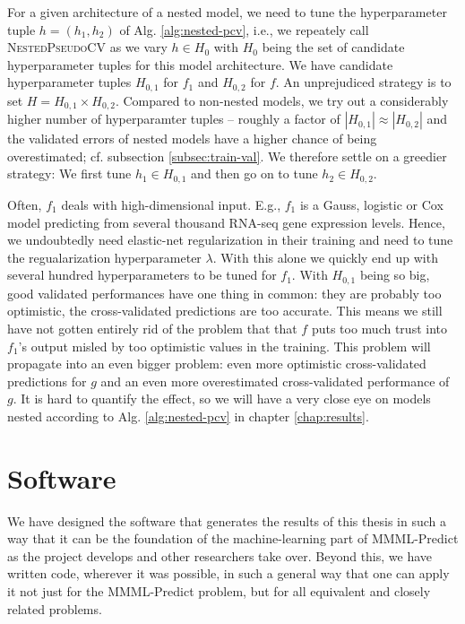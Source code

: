 For a given architecture of a nested model, we need to tune the hyperparameter tuple $h = (h_1, h_2)$ 
of 
Alg. \ref{alg:nested-pcv}, i.e., we repeately call \textsc{NestedPseudoCV} as we vary $h \in H_0$
with $H_0$ being the set of candidate hyperparameter tuples for this model architecture. We have 
candidate 
hyperparameter tuples $H_{0, 1}$ for $f_1$ and $H_{0, 2}$ for $f$. An unprejudiced strategy is to 
set $H = H_{0, 1} \times H_{0, 2}$. Compared to non-nested models, we try out a considerably 
higher number of hyperparamter tuples -- roughly a factor of $|H_{0, 1}| \approx |H_{0, 2}|$ and 
the validated errors of nested models have a higher chance 
of being overestimated; cf. subsection \ref{subsec:train-val}. We therefore settle on a greedier 
strategy: We first tune $h_1 \in H_{0, 1}$ and then go on to tune $h_2 \in H_{0, 2}$. 

Often, $f_1$ deals with high-dimensional input. E.g., $f_1$ is a Gauss, logistic or Cox model 
predicting from 
several thousand RNA-seq gene expression levels. Hence, we undoubtedly need elastic-net 
regularization in their training and need to tune the regualarization hyperparameter $\lambda$. 
With this alone we quickly end up with several hundred hyperparameters to be tuned for $f_1$. 
With $H_{0,1}$ being so big, good validated performances have one thing in common: they are 
probably too optimistic, the cross-validated predictions are too accurate. This means we still 
have not gotten entirely rid of the problem that that $f$ puts too much trust into $f_1$'s output 
misled by too optimistic values in the training. This problem will propagate into an even bigger 
problem: even more optimistic cross-validated predictions for $g$ and an even more overestimated 
cross-validated performance of $g$. It is hard to quantify the effect, so we will have a very close 
eye on models nested according to Alg. \ref{alg:nested-pcv} in chapter \ref{chap:results}. 

\section{Software}

We have designed the software that generates the results of this thesis in such a way that it 
can be the foundation of the machine-learning part of MMML-Predict as the project develops and 
other researchers take over. Beyond this, we have written code, wherever it was possible, in such 
a general way that one can apply it not just for the MMML-Predict problem, but for all equivalent 
and closely related problems.

